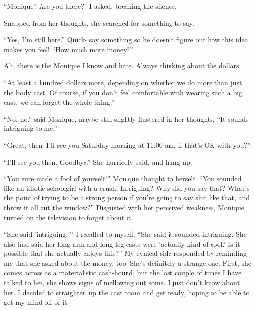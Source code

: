 ``Monique? Are you there?'' I asked, breaking the silence.

Snapped from her thoughts, she searched for something to say.

``Yes, I'm still here.'' Quick- say something so he doesn't figure out how this idea makes you
feel! ``How much more money?''

Ah, there is the Monique I know and hate. Always thinking about the dollars.

``At least a hundred dollars more, depending on whether we do more than just the body cast.
Of course, if you don't feel comfortable with wearing such a big cast, we can forget the whole
thing.''

``No, no.'' said Monique, maybe still slightly flustered in her thoughts. ``It sounds
intriguing to me.''

``Great, then. I'll see you Saturday morning at 11:00 am, if that's OK with you?''

``I'll see you then. Goodbye.'' She hurriedly said, and hung up.

\begin{thought}
``You sure made a fool of yourself!'' Monique thought to herself. ``You sounded like an idiotic
schoolgirl with a crush! Intriguing? Why did you say that? What's the point of trying to be a
strong person if you're going to say shit like that, and throw it all out the window?''
Disgusted
with her perceived weakness, Monique turned on the television to forget about it.
\end{thought}

``She said 'intriguing,''' I recalled to myself. ``She said it sounded intriguing. She also had
said her long arm and long leg casts were ‘actually kind of cool.' Is it possible that she
actually enjoys this?'' My cynical side responded by reminding me that she asked about the
money,
too. She's definitely a strange one. First, she comes across as a materialistic cash-hound, but
the last couple of times I have talked to her, she shows signs of mellowing out some. I just
don't know about her. I decided to straighten up the cast room and get ready, hoping to be able
to get my mind off of it.

